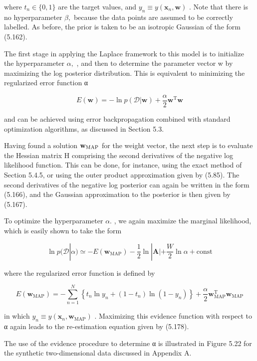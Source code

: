 \documentclass[
  10
]{article}
\begin{document}
where \(t _ { n } \in \{ 0 , 1 \}\) are the target values, and
\(y _ { n } \equiv y ( \mathbf x _ { n } , \mathbf w )\) . Note that
there is no hyperparameter \(\beta ,\) because the data points are
assumed to be correctly labelled. As before, the prior is taken to be an
isotropic Gaussian of the form (5.162).

The first stage in applying the Laplace framework to this model is to
initialize the hyperparameter \(\alpha ,\) , and then to determine the
parameter vector w by maximizing the log posterior distribution. This is
equivalent to minimizing the regularized error function α

\[
E (\mathbf {w}) = - \ln p (\mathcal {D} | \mathbf {w}) + \frac {\alpha}{2} \mathbf {w} ^ {\mathrm{T}} \mathbf {w}\tag{5.182}
\]

and can be achieved using error backpropagation combined with standard
optimization algorithms, as discussed in Section 5.3.

Having found a solution \({ \bf w } _ { \mathrm { M A P } }\) for the
weight vector, the next step is to evaluate the Hessian matrix H
comprising the second derivatives of the negative log likelihood
function. This can be done, for instance, using the exact method of
Section 5.4.5, or using the outer product approximation given by (5.85).
The second derivatives of the negative log posterior can again be
written in the form (5.166), and the Gaussian approximation to the
posterior is then given by (5.167).

To optimize the hyperparameter \(\alpha .\) , we again maximize the
marginal likelihood, which is easily shown to take the form

\[
\ln p (\mathcal {D} | \alpha) \simeq - E (\mathbf {w} _ {\mathrm{MAP}}) - \frac {1}{2} \ln | \mathbf {A} | + \frac {W}{2} \ln \alpha + \mathrm{const}\tag{5.183}
\]

where the regularized error function is defined by

\[
E (\mathbf {w} _ {\mathrm{MAP}}) = - \sum_ {n = 1} ^ {N} \left\{t _ {n} \ln y _ {n} + (1 - t _ {n}) \ln (1 - y _ {n}) \right\} + \frac {\alpha}{2} \mathbf {w} _ {\mathrm{MAP}} ^ {\mathrm{T}} \mathbf {w} _ {\mathrm{MAP}}\tag{5.184}
\]

in which
\(y _ { n } \equiv y ( \mathbf { x } _ { n } , \mathbf { w } _ { \mathrm { M A P } } )\)
. Maximizing this evidence function with respect to α again leads to the
re-estimation equation given by (5.178).

The use of the evidence procedure to determine α is illustrated in
Figure 5.22 for the synthetic two-dimensional data discussed in Appendix
A.
\end{document}
